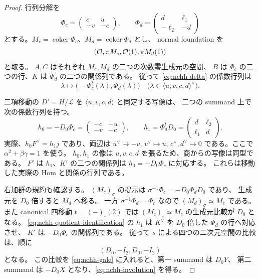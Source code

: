\begin{proof}
行列分解を
\[
\Phi_c=\begin{pmatrix}c&u\\-v&-c\end{pmatrix},\qquad
\Phi_d=\begin{pmatrix}d&\ell_1\\-\ell_2&-d\end{pmatrix}
\]
とする。$M_c=\operatorname{coker}\Phi_c$、$M_d=\operatorname{coker}\Phi_d$ とし、
normal foundation を
\[
(\mathcal O,\pi M_c,\mathcal O(1),\pi M_d(1))
\]
と取る。
$A,C$ はそれぞれ $M_c,M_d$ の二つの次数零生成元の空間、
$B$ は $\Phi_c$ の二つの行、$K$ は $\Phi_d$ の二つの関係列である。
従って \eqref{eq:nchh-delta} の係数行列は
\begin{equation}\label{eq:nchh-plane}
\lambda\longmapsto
\bigl(-\Phi_c^{t}(\lambda),\Phi_d(\lambda)\bigr)
\quad\bigl(\lambda\in\langle u,v,c,d\rangle^{\vee}\bigr).
\end{equation}

二項移動の $D'=H/\mathscr L$ を $\langle u,v,c,d\rangle$ と同定する写像は、
二つの summand 上で次の係数行列を持つ。
\begin{equation}\label{eq:nchh-quotient-identification}
h_0=-D_0\Phi_c=
\begin{pmatrix}-c&-u\\-v&-c\end{pmatrix},\qquad
h_1=\Phi_d^tD_0=
\begin{pmatrix}d&\ell_2\\\ell_1&d\end{pmatrix}.
\end{equation}
実際、$h_0F^{\vee}=h_1j$ であり、両辺は
$u^{\vee}\mapsto-v$, $v^{\vee}\mapsto u$, $c^{\vee},d^{\vee}\mapsto0$
である。ここで $\alpha^2+\beta\gamma=1$ を使う。
$h_0,h_1$ の像は $u,v,c,d$ を張るため、商からの写像は同型である。
$F'$ は $h_1$、$K'$ の二つの関係列は $h_0=-D_0\Phi_c$ に対応する。
これらは移動した実際の Hom と関係の行列である。

右加群の規約も確認する。
$(M_c)_\sigma$ の提示は
$\sigma^{-1}\Phi_c=-D_0\Phi_dD_0$ であり、
生成元を $D_0$ 倍すると $M_d$ へ移る。
一方 $\sigma^{-1}\Phi_d=\Phi_c$ なので $(M_d)_\sigma\simeq M_c$ である。
また canonical 四移動 $t=(-)_\iota(2)$ では
$(M_c)_\iota\simeq M_c$ の生成元比較が $D_0$ となる。
\eqref{eq:nchh-quotient-identification} の $h_1$ は
$K^{\vee}$ を $D_0$ 倍した $\Phi_d$ の行へ対応させ、
$K'$ は $-D_0\Phi_c$ の関係列である。
従って $s$ による四つの二次元空間の比較は、順に
\begin{equation}\label{eq:nchh-four-comparisons}
(D_0,-I_2,D_0,-I_2)
\end{equation}
となる。
この比較を \eqref{eq:nchh-gale} に入れると、第一 summand は $D_0Y$、
第二 summand は $-D_0X$ となり、\eqref{eq:nchh-involution} を得る。


\end{proof}
